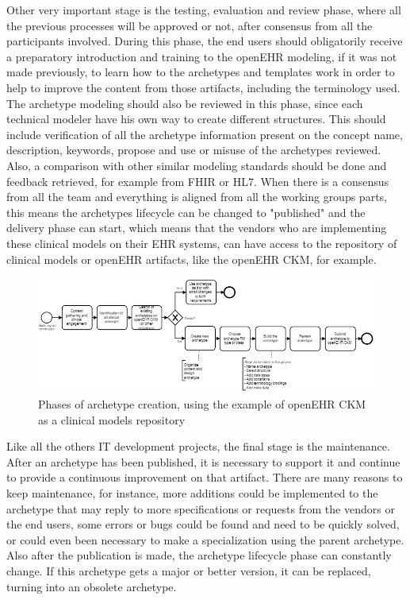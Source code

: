 \documentclass[mim_thesis.tex]{subfiles}
\begin{document}
Other very important stage is the testing, evaluation and review phase, where all the previous processes will be approved or not, after consensus from all the participants involved. During this phase, the end users should obligatorily receive a preparatory introduction and training to the openEHR modeling, if it was not made previously, to learn how to the archetypes and templates work in order to help to improve the content from those artifacts, including the terminology used. The archetype modeling should also be reviewed in this phase, since each technical modeler have his own way to create different structures. This should include verification of all the archetype information present on the concept name, description, keywords, propose and use or misuse of the archetypes reviewed. Also, a comparison with other similar modeling standards should be done and feedback retrieved, for example from FHIR or HL7. When there is a consensus from all the team and everything is aligned from all the working groups parts, this means the archetypes lifecycle can be changed to "published" and the delivery phase can start, which means that the vendors who are implementing these clinical models on their EHR systems, can have access to the repository of clinical models or openEHR artifacts, like the openEHR CKM, for example. \\

\begin{figure}[H]
	\centering
    \includegraphics[width=1.15\textwidth]{img/archetype_build_process.PNG}
	\caption{Phases of archetype creation, using the example of openEHR CKM as a clinical models repository}
	\label{fig:LC_ARCH}
\end{figure}



\newpage

Like all the others IT development projects, the final stage is the maintenance. After an archetype has been published, it is necessary to support it and continue to provide a continuous improvement on that artifact. There are many reasons to keep maintenance, for instance, more additions could be implemented to the archetype that may reply to more specifications or requests from the vendors or the end users, some errors or bugs could be found and need to be quickly solved, or could even been necessary to make a specialization using the parent archetype. Also after the publication is made, the archetype lifecycle phase can constantly change. If this archetype gets a major or better version, it can be replaced, turning into an obsolete archetype. \\
\end{document}
